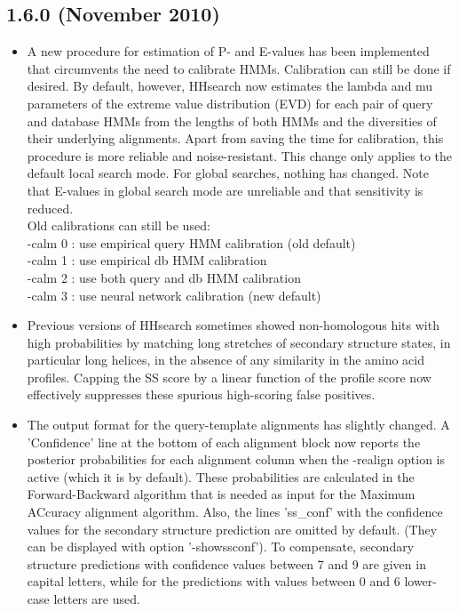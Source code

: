 \documentclass[11pt,a4paper]{article}
\begin{document}
\subsection{1.6.0 (November 2010)}

\begin{itemize}
 
\item{A new procedure for estimation of P- and E-values has been implemented that
  circumvents the need to calibrate HMMs. Calibration can still be done if 
  desired. By default, however, HHsearch now estimates the lambda and mu 
  parameters of the extreme value distribution (EVD) for each pair of query 
  and database HMMs from the lengths of both HMMs and the diversities of their 
  underlying alignments. Apart from saving the time for calibration, this 
  procedure is more reliable and noise-resistant. This change only applies to 
  the default local search mode. For global searches, nothing has changed. Note
  that E-values in global search mode are unreliable and that sensitivity is 
  reduced. \\
  Old calibrations can still be used:\\
   -calm 0 : use empirical query HMM calibration (old default)\\
   -calm 1 : use empirical db HMM calibration\\
   -calm 2 : use both query and db HMM calibration\\
   -calm 3 : use neural network calibration (new default)
}

\item{Previous versions of HHsearch sometimes showed non-homologous hits with high 
  probabilities by matching long stretches of secondary structure states, 
  in particular long helices, in the absence of any similarity in the amino 
  acid profiles. Capping the SS score by a linear function of the profile score
  now effectively suppresses these spurious high-scoring false positives. 
}

\item{The output format for the query-template alignments has slightly changed.
  A 'Confidence' line at the bottom of each alignment block now reports the 
  posterior probabilities for each alignment column when the -realign option
  is active (which it is by default). These probabilities are calculated in the 
  Forward-Backward algorithm that is needed as input for the Maximum ACcuracy 
  alignment algorithm. Also, the lines 'ss\_conf' with the confidence values 
  for the secondary structure prediction are omitted by default. (They can  
  be displayed with option '-showssconf'). To compensate, secondary structure 
  predictions with confidence values between 7 and 9 are given in capital 
  letters, while for the predictions with values between 0 and 6 lower-case 
  letters are used. 
}


\end{itemize}
\end{document}

